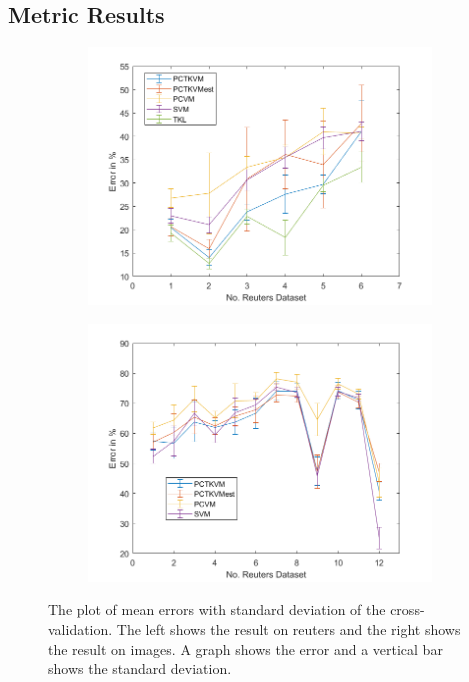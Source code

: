 \subsection{Metric Results}\label{EmSubSecMetricResult}
\begin{figure}
	\centering
	\begin{subfigure}{.5\textwidth}
		\centering
		\includegraphics[width=1\linewidth]{figures/PerformanceReuters.png}
		\caption{\label{FigErrorReu}}
	\end{subfigure}%
	\begin{subfigure}{.5\textwidth}
		\centering
		\includegraphics[width=1\linewidth]{figures/PerformanceImage.png}
		\caption{\label{FigErrorImg}}
	\end{subfigure}
	\caption[Plot of mean Error and standard Deviation]{The plot of mean errors with standard deviation of the cross-validation. The left shows the result on reuters and the right shows the result on images. A graph shows the error and a vertical bar shows the standard deviation. \label{FigErrorDatasets}}
\end{figure}
